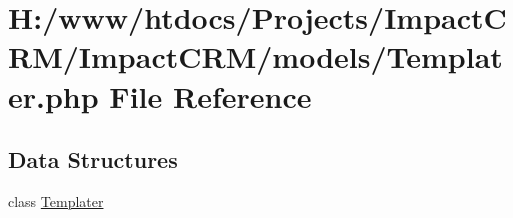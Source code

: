 \hypertarget{Templater_8php}{
\section{H:/www/htdocs/Projects/ImpactCRM/ImpactCRM/models/Templater.php File Reference}
\label{Templater_8php}
}
\subsection*{Data Structures}
\begin{DoxyCompactItemize}
\item 
class \hyperlink{classTemplater}{Templater}
\end{DoxyCompactItemize}
